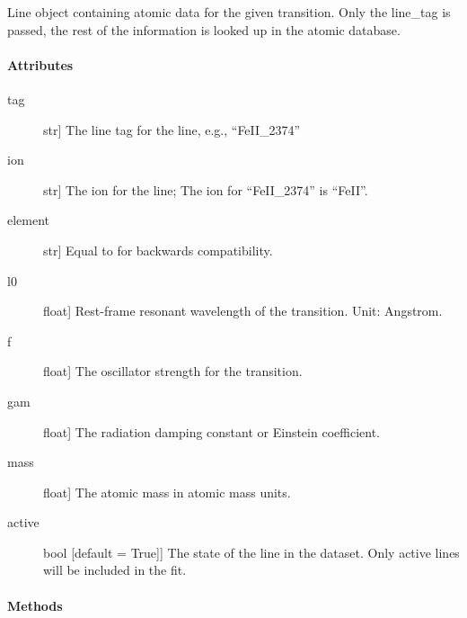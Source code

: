 \documentclass[letterpaper,10pt,english]{sphinxmanual}
\begin{document}
\begin{fulllineitems}
\label{\detokenize{api:dataset.Line}}
Line object containing atomic data for the given transition.
Only the line\_tag is passed, the rest of the information is
looked up in the atomic database.
\paragraph{Attributes}
\begin{description}
\item[{tag}] \leavevmode{[}str{]}
The line tag for the line, e.g., “FeII\_2374”

\item[{ion}] \leavevmode{[}str{]}
The ion for the line; The ion for “FeII\_2374” is “FeII”.

\item[{element}] \leavevmode{[}str{]}
Equal to  for backwards compatibility.

\item[{l0}] \leavevmode{[}float{]}
Rest-frame resonant wavelength of the transition.
Unit: Angstrom.

\item[{f}] \leavevmode{[}float{]}
The oscillator strength for the transition.

\item[{gam}] \leavevmode{[}float{]}
The radiation damping constant or Einstein coefficient.

\item[{mass}] \leavevmode{[}float{]}
The atomic mass in atomic mass units.

\item[{active}] \leavevmode{[}bool   {[}default = True{]}{]}
The state of the line in the dataset. Only active lines will
be included in the fit.

\end{description}
\paragraph{Methods}


\begin{savenotes}\sphinxatlongtablestart\begin{longtable}{p{0.5\linewidth}p{0.5\linewidth}}
\hline


\end{longtable}
\end{savenotes}
\end{fulllineitems}
\end{document}
